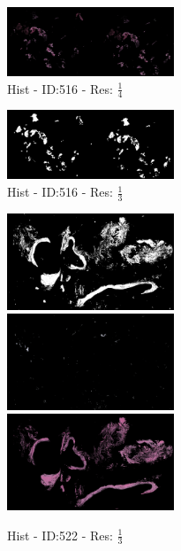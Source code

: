 \documentclass[a4paper,10pt,oneside]{article}
\begin{document}
\begin{figure}[hbtp]
\begin{subfigure}[b]{5cm}
    \includegraphics[width=5cm]{visualization/results/histogramSeg/res_reduce_4/Region_2_PO13-00516A1_1_7_201305171148.png}
    \caption{Hist - ID:516 - Res: $\frac{1}{4}$}
  \end{subfigure}
  \begin{subfigure}[b]{5cm}
    \includegraphics[width=5cm]{visualization/results/histogramSeg/res_reduce_5/Region_0_PO13-00516A1_1_7_201305171148.png}
    \caption{Hist - ID:516 - Res: $\frac{1}{3}$}
  \end{subfigure}
  \begin{subfigure}[b]{5cm}
    \includegraphics[width=5cm]{visualization/results/histogramSeg/res_reduce_3/Region_0_PO13-00522A1_1_2_201305171639.png}
    \includegraphics[width=5cm]{visualization/results/histogramSeg/res_reduce_3/Region_1_PO13-00522A1_1_2_201305171639.png}
    \includegraphics[width=5cm]{visualization/results/histogramSeg/res_reduce_3/Region_2_PO13-00522A1_1_2_201305171639.png}
    \caption{Hist - ID:522 - Res: $\frac{1}{3}$}
  \end{subfigure}
  \begin{subfigure}[b]{5cm}

\end{subfigure}
\end{figure}
\end{document}
